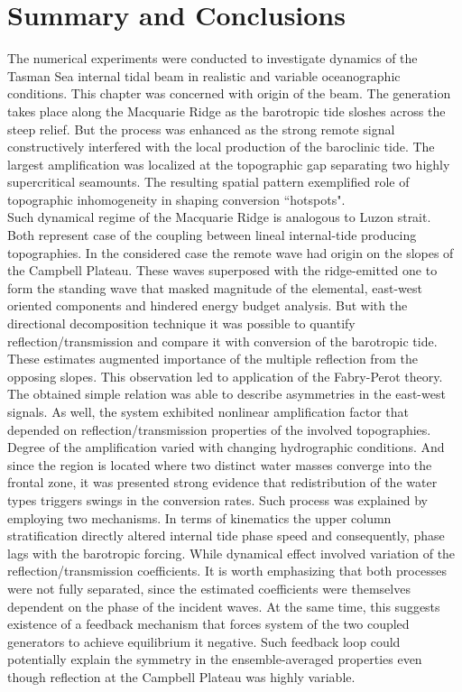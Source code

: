 \documentclass[12pt]{article}
\begin{document}
\section{Summary and Conclusions}
The numerical experiments were conducted to investigate dynamics of the Tasman Sea internal tidal 
beam in realistic and variable oceanographic conditions. This chapter was concerned with origin of 
the beam. The generation takes place along the Macquarie Ridge as the barotropic tide sloshes across 
the steep relief. But the process was enhanced as the strong remote signal constructively interfered with the local production of the baroclinic tide. The largest amplification was localized at the topographic gap separating two highly supercritical 
seamounts. The resulting spatial pattern exemplified role of topographic inhomogeneity in shaping 
conversion ``hotspots".\\

Such dynamical regime of the Macquarie Ridge is analogous to Luzon strait. Both represent case of 
the coupling between lineal internal-tide producing topographies. In the considered 
case the 
remote wave had origin on the slopes of the Campbell Plateau. These waves superposed with the 
ridge-emitted one to form the standing wave that masked magnitude of the elemental, east-west 
oriented components and hindered energy budget analysis. But with the directional decomposition 
technique it was possible to quantify reflection/transmission and compare it with conversion of 
the barotropic tide. These estimates augmented importance of the multiple reflection from the 
opposing slopes. This observation led to application of the Fabry-Perot theory. The obtained simple 
relation was able to describe asymmetries in the east-west signals. As well, the system exhibited 
nonlinear amplification factor that depended on reflection/transmission properties of the involved 
topographies.\\

Degree of the amplification varied with changing hydrographic conditions. And 
since the region is located where two distinct water masses converge into the frontal zone, 
it was presented strong evidence that redistribution of the water types triggers swings in the 
conversion 
rates. Such process was explained by employing two mechanisms. In terms of kinematics the upper column 
stratification directly altered internal tide phase speed and consequently, phase lags with the 
barotropic forcing. While dynamical effect involved variation of the reflection/transmission 
coefficients. It is worth emphasizing that both processes were not fully separated, since the 
estimated coefficients were themselves dependent on the phase of the incident waves. At the same 
time, this suggests existence of a feedback mechanism that forces system of the two coupled 
generators to achieve equilibrium it negative. Such feedback loop could potentially explain the 
symmetry in the ensemble-averaged properties even though reflection at the Campbell Plateau was 
highly 
variable.\\
\end{document}
